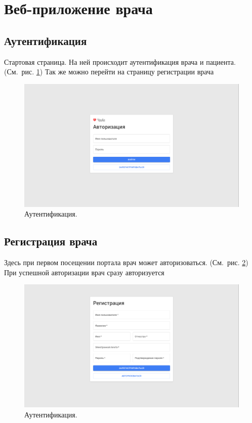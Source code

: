 \section{Веб-приложение врача}\label{sec:-2}

\subsection{Аутентификация}\label{subsec:}
Стартовая страница.
На ней происходит аутентификация врача и пациента.
(См.\ рис. \ref{fig:figure4})
Так же можно перейти на страницу регистрации врача
\begin{figure}[h]
    \centering
    \includegraphics[width=\textwidth]{images/screenshots/auth}
    \caption{Аутентификация.}
    \label{fig:figure4}
\end{figure}


\subsection{Регистрация врача}\label{subsec:-5}
Здесь при первом посещении портала врач может авторизоваться.
(См.\ рис. \ref{fig:figure41})
При успешной авторизации врач сразу авторизуется
\begin{figure}[h]
    \centering
    \includegraphics[width=\textwidth]{images/screenshots/doctor_registration}
    \caption{Аутентификация.}
    \label{fig:figure41}
\end{figure}


